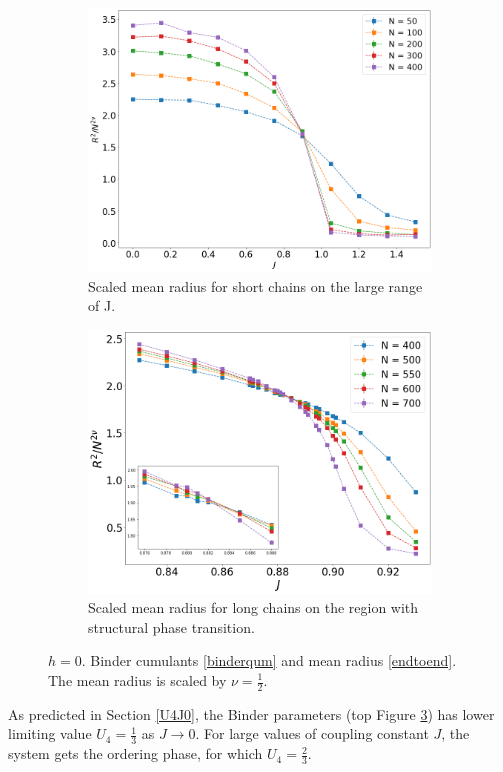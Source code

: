 \begin{figure}
	\begin{subfigure}[b]{0.45\textwidth}
		\includegraphics[width=\textwidth]{Images/3_rscaling_shortchains.png}
		\caption{ Scaled mean radius for short chains on the large range of J.  }
		\label{fig:bcshort_shortradius_3}
	\end{subfigure}
	\begin{subfigure}[b]{0.45\textwidth}
		\includegraphics[width=\textwidth]{Images/3_rscaling_longchains.png}
		\caption{Scaled mean radius for long chains on the region with structural phase transition. }
		\label{fig:bcshort_longradius_3}
	\end{subfigure}
	\caption{$h=0$. Binder  cumulants \eqref{binderqum} and mean radius \eqref{endtoend}. The mean radius is scaled by $\nu = \frac{1}{2}$.   }
	\label{fig:bcshort_3D}
\end{figure}
As predicted in Section \ref{U4J0}, the Binder parameters (top Figure \ref{fig:bcshort_3D}) has lower limiting value $U_4=\frac{1}{3}$ as $J\rightarrow0$. For large values of coupling constant $J$, the system gets the ordering phase, for which $U_4=\frac{2}{3}$. 
    
